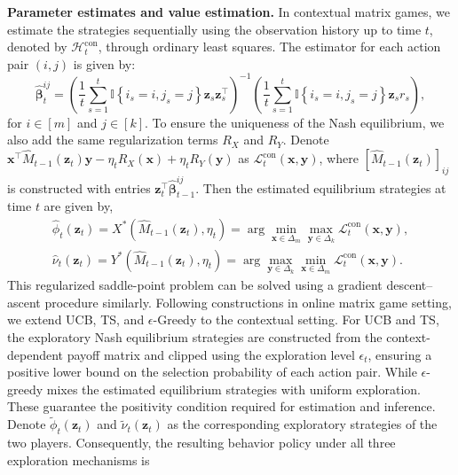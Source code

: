 \documentclass[12pt]{article}
\begin{document}
\noindent\textbf{Parameter estimates and value estimation.} In contextual matrix games, we estimate the strategies sequentially using the observation history up to time $t$, denoted by $\mathcal{H}^{\mathrm{con}}_{t}$, through ordinary least squares. The estimator for each action pair $(i, j)$ is given by:
\begin{equation}
    \label{equ:para_con}
    \widehat{\bm{\beta}}^{ij}_t = \left(\frac{1}{t} \sum_{s=1}^{t} \mathbb{I}\left\{i_s=i,j_s=j \right\} \bm{z}_s \bm{z}_s^{\top}\right)^{-1} \left( \frac{1}{t} \sum_{s=1}^t \mathbb{I}\left\{i_s=i,j_s=j \right\} \bm{z}_s r_s \right),
\end{equation}
for $i\in[m]$ and $j \in [k]$. To ensure the uniqueness of the Nash equilibrium, we also add the same regularization terms $R_X$ and $R_Y$. Denote $\bm{x}^\top \widehat{M}_{t-1}(\bm{z}_t)\bm{y}-\eta_t R_X(\bm{x}) + \eta_t R_Y(\bm{y})$ as $\mathcal{L}_t^{\mathrm{con}}(\bm{x,\bm{y}})$, where $[\widehat{M}_{t-1}(\bm{z}_t)]_{ij}$ is constructed with entries $\bm{z}_t^\top \widehat{\bm{\beta}}^{ij}_{t-1}$. Then the estimated equilibrium strategies at time $t$ are given by,
\begin{equation}
\begin{aligned}
\label{equ:policy_con}
    \widehat{\phi}_t (\bm{z}_t) =X^\ast(\widehat{M}_{t-1}(\bm{z}_t),\eta_t)= \arg\min_{\bm{x} \in \Delta_m} \max_{\bm{y}\in \Delta_k} \mathcal{L}_t^{\mathrm{con}}(\bm{x,\bm{y}}), \\
    \widehat{\nu}_t (\bm{z}_t) =Y^\ast(\widehat{M}_{t-1}(\bm{z}_t),\eta_t)= \arg \max_{\bm{y}\in \Delta_k} \min_{\bm{x} \in \Delta_m} \mathcal{L}_t^{\mathrm{con}}(\bm{x,\bm{y}}).
\end{aligned}
\end{equation}
This regularized saddle-point problem can be
solved using a gradient descent–ascent procedure similarly. 
Following constructions in online matrix game setting, we extend UCB, TS, and $\epsilon$-Greedy to the contextual setting. 
For UCB and TS, the exploratory Nash equilibrium strategies are constructed from the context-dependent payoff matrix and clipped using the exploration level $\epsilon_t$, ensuring a positive lower bound on the selection probability of each action pair. While $\epsilon$-greedy mixes the estimated equilibrium strategies with uniform exploration. These guarantee the positivity condition required for estimation and inference. Denote $\widetilde{\phi}_t(\bm z_t)$ and $\widetilde{\nu}_t(\bm z_t)$ as the corresponding exploratory strategies of the two players. 
Consequently, the resulting behavior policy under all three exploration mechanisms is 
\end{document}
